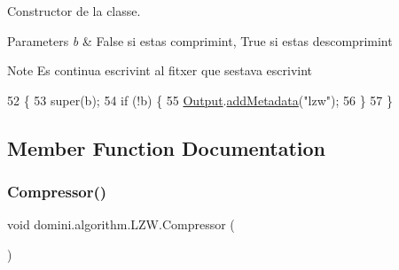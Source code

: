 Constructor de la classe. 


\begin{DoxyParams}{Parameters}
{\em b} & False si estas comprimint, True si estas descomprimint \\
\hline
\end{DoxyParams}
\begin{DoxyNote}{Note}
Es continua escrivint al fitxer que s\textquotesingle{}estava escrivint 
\end{DoxyNote}

\begin{DoxyCode}
52                           \{
53         super(b);
54         \textcolor{keywordflow}{if} (!b) \{
55             \hyperlink{classdomini_1_1algorithm_1_1Algorithm_a4de9955411c656325adc391ef570c082}{Output}.\hyperlink{classpersistencia_1_1output_1_1Ctrl__Output_ae6d6857910a023982900ddc857b891f0}{addMetadata}(\textcolor{stringliteral}{"lzw"});
56         \}
57     \}
\end{DoxyCode}


\subsection{Member Function Documentation}
\mbox{\label{classdomini_1_1algorithm_1_1LZW_a04a13292c78f6d958270fec8bc6975be}} 
\subsubsection{\texorpdfstring{Compressor()}{Compressor()}}
{\footnotesize\ttfamily void domini.\+algorithm.\+L\+Z\+W.\+Compressor (\begin{DoxyParamCaption}{ }\end{DoxyParamCaption})\hspace{0.3cm}{\ttfamily [inline]}}


